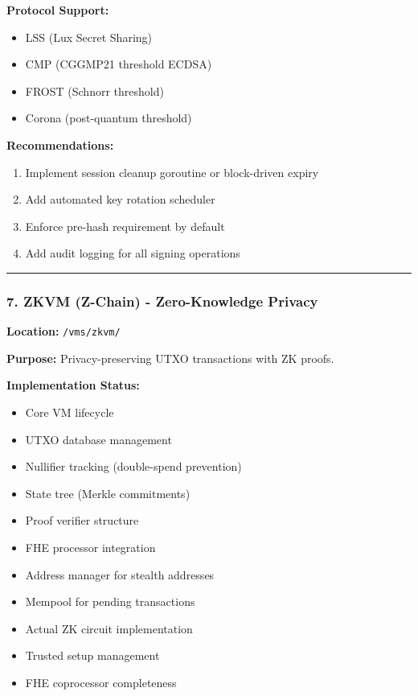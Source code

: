\documentclass[
]{article}
\providecommand{\tightlist}{%
  \setlength{\itemsep}{0pt}\setlength{\parskip}{0pt}}
\begin{document}
\textbf{Protocol Support:}

\begin{itemize}
\tightlist
\item
  LSS (Lux Secret Sharing)
\item
  CMP (CGGMP21 threshold ECDSA)
\item
  FROST (Schnorr threshold)
\item
  Corona (post-quantum threshold)
\end{itemize}

\textbf{Recommendations:}

\begin{enumerate}
\def\labelenumi{\arabic{enumi}.}
\tightlist
\item
  Implement session cleanup goroutine or block-driven expiry
\item
  Add automated key rotation scheduler
\item
  Enforce pre-hash requirement by default
\item
  Add audit logging for all signing operations
\end{enumerate}

\begin{center}\rule{0.5\linewidth}{0.5pt}\end{center}

\subsubsection{7. ZKVM (Z-Chain) - Zero-Knowledge
Privacy}\label{7-zkvm-z-chain---zero-knowledge-privacy}

\textbf{Location:} \texttt{/vms/zkvm/}

\textbf{Purpose:} Privacy-preserving UTXO transactions with ZK proofs.

\textbf{Implementation Status:}

\begin{itemize}
\tightlist
\item[$\boxtimes$]
  Core VM lifecycle
\item[$\boxtimes$]
  UTXO database management
\item[$\boxtimes$]
  Nullifier tracking (double-spend prevention)
\item[$\boxtimes$]
  State tree (Merkle commitments)
\item[$\boxtimes$]
  Proof verifier structure
\item[$\boxtimes$]
  FHE processor integration
\item[$\boxtimes$]
  Address manager for stealth addresses
\item[$\boxtimes$]
  Mempool for pending transactions
\item[$\square$]
  Actual ZK circuit implementation
\item[$\square$]
  Trusted setup management
\item[$\square$]
  FHE coprocessor completeness
\end{itemize}
\end{document}
